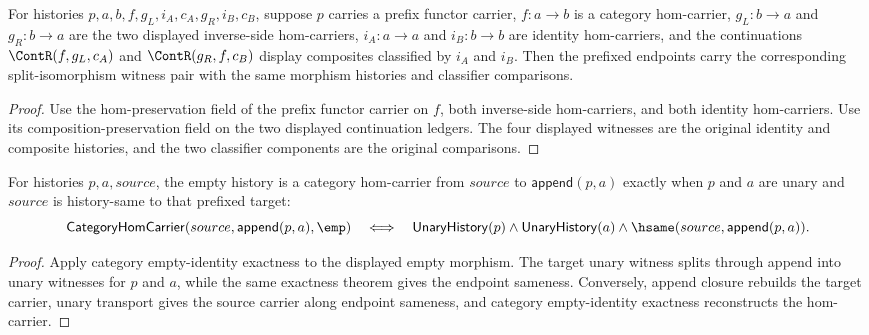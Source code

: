 \begin{theorem}
\label{thm:prefix-functor-carrier-split-iso-witness-pair-preserves}
For histories $p,a,b,f,g_L,i_A,c_A,g_R,i_B,c_B$, suppose $p$ carries a
prefix functor carrier, $f:a\to b$ is a category hom-carrier, $g_L:b\to a$
and $g_R:b\to a$ are the two displayed inverse-side hom-carriers, $i_A:a\to a$
and $i_B:b\to b$ are identity hom-carriers, and the continuations
$\ContR(f,g_L,c_A)$ and $\ContR(g_R,f,c_B)$ display composites classified by
$i_A$ and $i_B$. Then the prefixed endpoints carry the corresponding
split-isomorphism witness pair with the same morphism histories and
classifier comparisons.
\end{theorem}
\begin{proof}
Use the hom-preservation field of the prefix functor carrier on $f$, both
inverse-side hom-carriers, and both identity hom-carriers. Use its
composition-preservation field on the two displayed continuation ledgers. The
four displayed witnesses are the original identity and composite histories,
and the two classifier components are the original comparisons.
\end{proof}

\begin{theorem}
\label{thm:functor-prefix-empty-morphism-source}
For histories $p,a,source$, the empty history is a category hom-carrier from
$source$ to $\mathsf{append}(p,a)$ exactly when $p$ and $a$ are unary and
$source$ is history-same to that prefixed target:
$$
\mathsf{CategoryHomCarrier}(source,\mathsf{append}(p,a),\emp)
\quad\Longleftrightarrow\quad
\mathsf{UnaryHistory}(p)\wedge\mathsf{UnaryHistory}(a)\wedge
\hsame(source,\mathsf{append}(p,a)).
$$
\end{theorem}
\begin{proof}
Apply category empty-identity exactness to the displayed empty morphism. The
target unary witness splits through append into unary witnesses for $p$ and
$a$, while the same exactness theorem gives the endpoint sameness. Conversely,
append closure rebuilds the target carrier, unary transport gives the source
carrier along endpoint sameness, and category empty-identity exactness
reconstructs the hom-carrier.
\end{proof}

